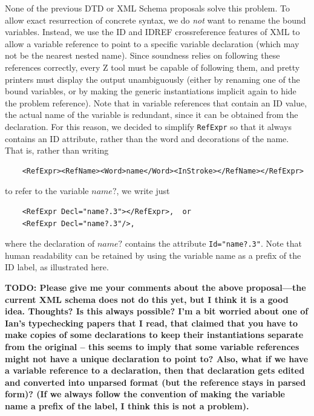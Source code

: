 \documentclass{llncs}  %
\newcommand{\AFont}[1]{\texttt{#1}}
\newcommand{\TODO}[1]{\textbf{TODO: #1}}   %
\begin{document}
None of the previous DTD or XML Schema proposals solve this problem.
To allow exact resurrection of concrete syntax, we do \emph{not} want to
rename the bound variables.  Instead, we use the ID and IDREF
crossreference features of XML to allow a variable reference to point to
a specific variable declaration (which may not be the nearest nested
name).  Since soundness relies on following these references correctly,
every Z tool must be capable of following them, and pretty printers must
display the output unambiguously (either by renaming one of the bound
variables, or by making the generic instantiations implicit again to hide
the problem reference).  Note that in variable references that contain an ID
value, the actual name of the variable is redundant, since it can be
obtained from the declaration.  For this reason, we decided to simplify
\AFont{RefExpr} so that it always contains an ID attribute, rather than
the word and decorations of the name.  That is, rather than writing
\begin{verbatim}
    <RefExpr><RefName><Word>name</Word><InStroke></RefName></RefExpr>
\end{verbatim}
to refer to the variable $name?$, we write just
\begin{verbatim}
    <RefExpr Decl="name?.3"></RefExpr>,  or
    <RefExpr Decl="name?.3"/>,
\end{verbatim}
where the declaration of $name?$ contains the attribute
\verb!Id="name?.3"!.  Note that human readability can be retained
by using the variable name as a prefix of the ID label, as illustrated here.

\TODO{Please give me your comments about the above proposal---the current
  XML schema does not do this yet, but I think it is a good idea.
  Thoughts?  Is this always possible?  I'm a bit worried about one
  of Ian's typechecking papers that I read, that claimed that you
  have to make copies of some declarations to keep their instantiations
  separate from the original -- this seems to imply that some variable
  references might not have a unique declaration to point to?  Also, what
  if we have a variable reference to a declaration, then that declaration
  gets edited and converted into unparsed format (but the reference stays
  in parsed form)?  (If we always follow the convention of making the
  variable name a prefix of the label, I think this is not a problem).
}

\end{document}
